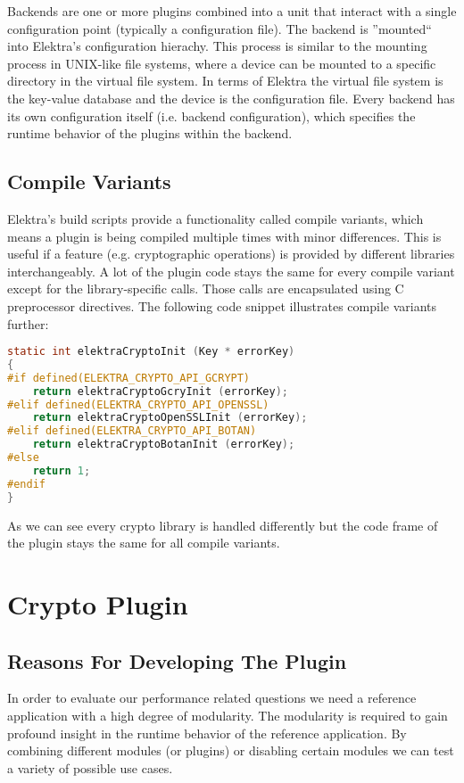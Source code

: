 Backends are one or more plugins combined into a unit that interact with a single configuration point (typically a configuration file).
The backend is ''mounted`` into Elektra's configuration hierachy.
This process is similar to the mounting process in UNIX-like file systems, where a device can be mounted to a specific directory in the virtual file system.
In terms of Elektra the virtual file system is the key-value database and the device is the configuration file.
Every backend has its own configuration itself (i.e. backend configuration), which specifies the runtime behavior of the plugins within the backend.

\subsection{Compile Variants}

Elektra's build scripts provide a functionality called compile variants, which means a plugin is being compiled multiple times with minor differences.
This is useful if a feature (e.g. cryptographic operations) is provided by different libraries interchangeably.
A lot of the plugin code stays the same for every compile variant except for the library-specific calls.
Those calls are encapsulated using C preprocessor directives.
The following code snippet illustrates compile variants further:

\begin{lstlisting}[language=C]
static int elektraCryptoInit (Key * errorKey)
{
#if defined(ELEKTRA_CRYPTO_API_GCRYPT)
	return elektraCryptoGcryInit (errorKey);
#elif defined(ELEKTRA_CRYPTO_API_OPENSSL)
	return elektraCryptoOpenSSLInit (errorKey);
#elif defined(ELEKTRA_CRYPTO_API_BOTAN)
	return elektraCryptoBotanInit (errorKey);
#else
	return 1;
#endif
}
\end{lstlisting}

As we can see every crypto library is handled differently but the code frame of the plugin stays the same for all compile variants.

\section{Crypto Plugin}\label{crypto-plugin}

\subsection{Reasons For Developing The Plugin}

In order to evaluate our performance related questions we need a reference application with a high degree of modularity.
The modularity is required to gain profound insight in the runtime behavior of the reference application.
By combining different modules (or plugins) or disabling certain modules we can test a variety of possible use cases.


